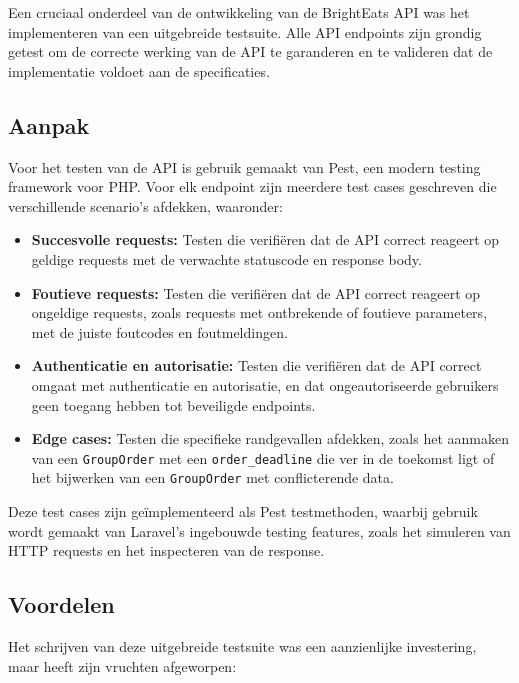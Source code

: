 Een cruciaal onderdeel van de ontwikkeling van de Bright\-Eats API was het implementeren van een uitgebreide testsuite. Alle API endpoints zijn grondig getest om de correcte werking van de API te garanderen en te valideren dat de implementatie voldoet aan de specificaties.

\subsection{Aanpak}

Voor het testen van de API is gebruik gemaakt van Pest, een modern testing framework voor PHP. Voor elk endpoint zijn meerdere test cases geschreven die verschillende scenario's afdekken, waaronder:

\begin{itemize}
  \item \textbf{Succesvolle requests:} Testen die verifiëren dat de API correct reageert op geldige requests met de verwachte statuscode en response body.
  \item \textbf{Foutieve requests:} Testen die verifiëren dat de API correct reageert op ongeldige requests, zoals requests met ontbrekende of foutieve parameters, met de juiste foutcodes en foutmeldingen.
  \item \textbf{Authenticatie en autorisatie:} Testen die verifiëren dat de API correct omgaat met authenticatie en autorisatie, en dat ongeautoriseerde gebruikers geen toegang hebben tot beveiligde endpoints.
  \item \textbf{Edge cases:} Testen die specifieke randgevallen afdekken, zoals het aanmaken van een \texttt{GroupOrder} met een \texttt{order\_deadline} die ver in de toekomst ligt of het bijwerken van een \texttt{GroupOrder} met conflicterende data.
\end{itemize}

Deze test cases zijn geïmplementeerd als Pest testmethoden, waarbij gebruik wordt gemaakt van Laravel's ingebouwde testing features, zoals het simuleren van HTTP requests en het inspecteren van de response.

\subsection{Voordelen}

Het schrijven van deze uitgebreide testsuite was een aanzienlijke investering, maar heeft zijn vruchten afgeworpen:

